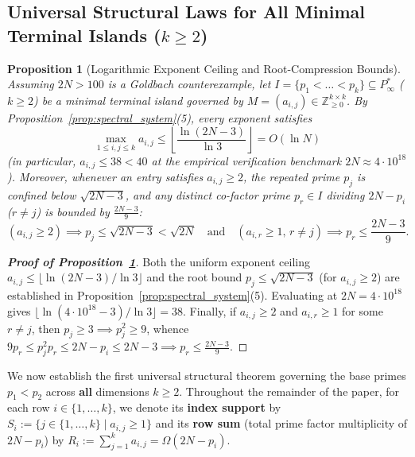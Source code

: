 \documentclass[11pt,a4paper]{article}
\newtheorem{proposition}[theorem]{Proposition}
\theoremstyle{definition}
\begin{document}
\subsection{Universal Structural Laws for All Minimal Terminal Islands (\texorpdfstring{$k \ge 2$}{k >= 2})}
\label{subsec:universal_bounds}

\begin{proposition}[Logarithmic Exponent Ceiling and Root-Compression Bounds]
\label{prop:root_compression}
Assuming $2N > 100$ is a Goldbach counterexample, let $I = \{p_1 < \dots < p_k\} \subseteq P^*_\infty$ ($k \ge 2$) be a minimal terminal island governed by $M = (a_{i,j}) \in \mathbb{Z}_{\ge 0}^{k \times k}$. By Proposition~\ref{prop:spectral_system}(5), every exponent satisfies
\[
\max_{1 \le i, j \le k} a_{i,j} \le \left\lfloor \frac{\ln(2N - 3)}{\ln 3} \right\rfloor = O(\ln N)
\]
(in particular, $a_{i,j} \le 38 < 40$ at the empirical verification benchmark $2N \approx 4 \cdot 10^{18}$ \cite{oliveira2014}). Moreover, whenever an entry satisfies $a_{i,j} \ge 2$, the repeated prime $p_j$ is confined below $\sqrt{2N - 3}$, and any distinct co-factor prime $p_r \in I$ dividing $2N - p_i$ ($r \neq j$) is bounded by $\frac{2N - 3}{9}$:
\[
\left( a_{i,j} \ge 2 \right) \implies p_j \le \sqrt{2N - 3} < \sqrt{2N} \quad \text{and} \quad \left( a_{i,r} \ge 1, \, r \neq j \right) \implies p_r \le \frac{2N - 3}{9}.
\]
\end{proposition}
\begin{proof}[\textbf{Proof of Proposition~\ref{prop:root_compression}}]
Both the uniform exponent ceiling $a_{i,j} \le \lfloor \ln(2N - 3)/\ln 3 \rfloor$ and the root bound $p_j \le \sqrt{2N - 3}$ (for $a_{i,j} \ge 2$) are established in Proposition~\ref{prop:spectral_system}(5). Evaluating at $2N = 4 \cdot 10^{18}$ gives $\lfloor \ln(4 \cdot 10^{18} - 3) / \ln 3 \rfloor = 38$. Finally, if $a_{i,j} \ge 2$ and $a_{i,r} \ge 1$ for some $r \neq j$, then $p_j \ge 3 \implies p_j^2 \ge 9$, whence $9 p_r \le p_j^2 p_r \le 2N - p_i \le 2N - 3 \implies p_r \le \frac{2N - 3}{9}$.
\end{proof}

We now establish the first universal structural theorem governing the base primes $p_1 < p_2$ across \textbf{all} dimensions $k \ge 2$. Throughout the remainder of the paper, for each row $i \in \{1, \dots, k\}$, we denote its \textbf{index support} by $S_i := \{j \in \{1, \dots, k\} \mid a_{i,j} \ge 1\}$ and its \textbf{row sum} (total prime factor multiplicity of $2N - p_i$) by $R_i := \sum_{j=1}^k a_{i,j} = \Omega(2N - p_i)$.
\end{document}
